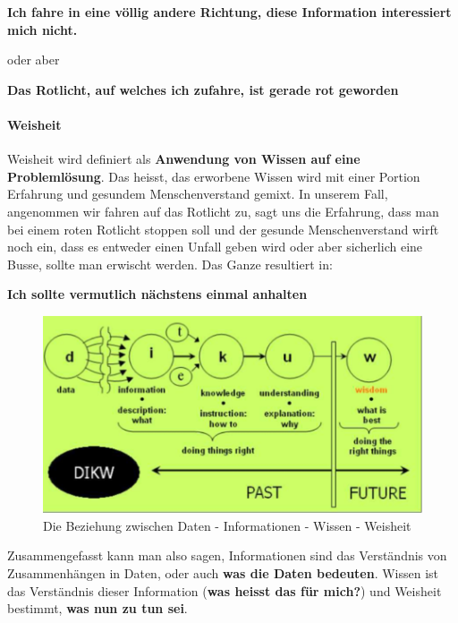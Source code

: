 \documentclass[a4paper, 11pt]{article}
\begin{document}
\begin{center}
\textbf{	Ich fahre in eine völlig andere Richtung, diese Information interessiert mich nicht.}
\end{center}

oder aber

\begin{center}
\textbf{	Das Rotlicht, auf welches ich zufahre, ist gerade rot geworden}
\end{center}

\paragraph{Weisheit}
Weisheit wird definiert als \textbf{Anwendung von Wissen auf eine Problemlösung}. Das heisst, das erworbene Wissen wird mit einer Portion Erfahrung und gesundem Menschenverstand gemixt. In unserem Fall, angenommen wir fahren auf das Rotlicht zu, sagt uns die Erfahrung, dass man bei einem roten Rotlicht stoppen soll und der gesunde Menschenverstand wirft noch ein, dass es entweder einen Unfall geben wird oder aber sicherlich eine Busse, sollte man erwischt werden. Das Ganze resultiert in:

\begin{center}
\textbf{	Ich sollte vermutlich nächstens einmal anhalten}
\end{center}

\vspace*{20px}

\begin{figure}[htb]
	\centering
	\includegraphics[keepaspectratio=true,height=15\baselineskip]{DIKW.PNG}
	\caption{Die Beziehung zwischen Daten - Informationen - Wissen - Weisheit}
	\label{fig:DIKW}
\end{figure}

Zusammengefasst kann man also sagen, Informationen sind das Verständnis von Zusammenhängen in Daten, oder auch \textbf{was die Daten bedeuten}. Wissen ist das Verständnis dieser Information (\textbf{was heisst das für mich?}) und Weisheit bestimmt, \textbf{was nun zu tun sei}. 
\newpage
\end{document}
